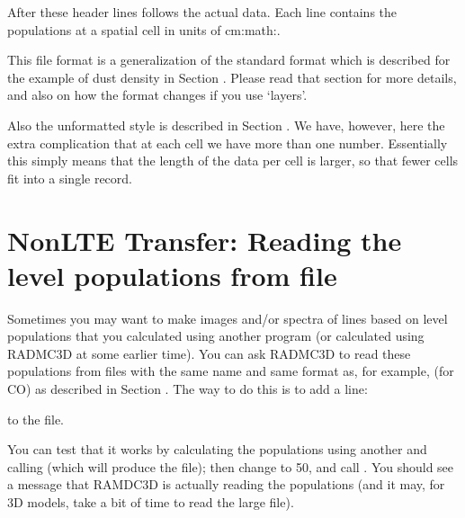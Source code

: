 \documentclass[letterpaper,10pt,english]{sphinxmanual}
\begin{document}
After these header lines follows the actual data. Each line contains the
populations at a spatial cell in units of cm:math:.

This file format is a generalization of the standard format which is
described for the example of dust density in Section {\hyperref[\detokenize{inputoutputfiles:sec-dustdens}]{}}.
Please read that section for more details, and also on how the format
changes if you use ‘layers’.

Also the unformatted style is described in Section {\hyperref[\detokenize{inputoutputfiles:sec-dustdens}]{}}. We
have, however, here the extra complication that at each cell we have more
than one number. Essentially this simply means that the length of the data
per cell is larger, so that fewer cells fit into a single record.


\section{Non\sphinxhyphen{}LTE Transfer: Reading the level populations from file}
\label{\detokenize{lineradtrans:non-lte-transfer-reading-the-level-populations-from-file}}\label{\detokenize{lineradtrans:sec-nonlte-read-levelpop}}
Sometimes you may want to make images and/or spectra of lines based on level
populations that you calculated using another program (or calculated using
RADMC\sphinxhyphen{}3D at some earlier time). You can ask RADMC\sphinxhyphen{}3D to read these
populations from files with the same name and same format as, for example,
 (for CO) as described in Section
{\hyperref[\detokenize{lineradtrans:sec-nonlte-write-levelpop}]{}}. The way to do this is to add a line:

\begin{sphinxVerbatim}[commandchars=\\\{\}]
  
\end{sphinxVerbatim}

to the  file.

You can test that it works by calculating the populations using another
 and calling  (which will produce the
 file); then change  to 50, and call . You should see a message that RAMDC\sphinxhyphen{}3D is actually reading the
populations (and it may, for 3\sphinxhyphen{}D models, take a bit of time to read the large
file).
\end{document}

